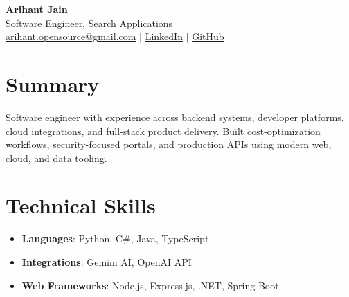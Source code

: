 \documentclass[11pt,a4paper]{article}
\begin{document}
\begin{center}
{\LARGE \textbf{Arihant Jain}}
\\ Software Engineer, Search Applications
\\ \href{mailto:arihant.opensource@gmail.com}{arihant.opensource@gmail.com} $\mid$ \href{https://linkedin.com/in/arihantjain1208}{LinkedIn} $\mid$ \href{https://github.com/Arihant1208}{GitHub}
\end{center}

\section{Summary}
Software engineer with experience across backend systems, developer platforms, cloud integrations, and full-stack product delivery. Built cost-optimization workflows, security-focused portals, and production APIs using modern web, cloud, and data tooling.

\section{Technical Skills}
\begin{itemize}
  \item \textbf{Languages}: Python, C\#, Java, TypeScript
  \item \textbf{Integrations}: Gemini AI, OpenAI API
  \item \textbf{Web Frameworks}: Node.js, Express.js, .NET, Spring Boot
\end{itemize}
\end{document}

